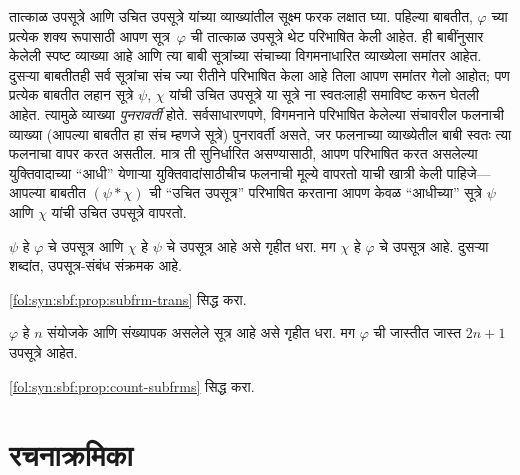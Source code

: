 \begin{explain}
तात्काळ उपसूत्रे आणि उचित उपसूत्रे यांच्या व्याख्यांतील
सूक्ष्म फरक लक्षात घ्या. पहिल्या बाबतीत, $\varphi$ च्या प्रत्येक शक्य
रूपासाठी आपण सूत्र~$\varphi$ ची तात्काळ उपसूत्रे थेट परिभाषित केली
आहेत. ही बाबींनुसार केलेली स्पष्ट व्याख्या आहे आणि त्या बाबी
सूत्रांच्या संचाच्या विगमनाधारित व्याख्येला समांतर आहेत. दुसऱ्या
बाबतीतही सर्व सूत्रांचा संच ज्या रीतीने परिभाषित केला आहे तिला
आपण समांतर गेलो आहोत; पण प्रत्येक बाबतीत लहान सूत्रे $\psi$, $\chi$
यांची उचित उपसूत्रे या सूत्रे ना स्वतःलाही समाविष्ट करून
घेतली आहेत.
त्यामुळे व्याख्या \emph{पुनरावर्ती} होते. सर्वसाधारणपणे, विगमनाने
परिभाषित केलेल्या संचावरील फलनाची व्याख्या (आपल्या बाबतीत हा संच म्हणजे
सूत्रे) पुनरावर्ती असते, जर फलनाच्या व्याख्येतील बाबी स्वतः त्या
फलनाचा वापर करत असतील. मात्र ती सुनिर्धारित असण्यासाठी, आपण परिभाषित
करत असलेल्या युक्तिवादाच्या ``आधी'' येणाऱ्या युक्तिवादांसाठीचीच फलनाची
मूल्ये वापरतो याची खात्री केली पाहिजे---आपल्या बाबतीत $(\psi \ast \chi)$
ची ``उचित उपसूत्र'' परिभाषित करताना आपण केवळ ``आधीच्या''
सूत्रे $\psi$ आणि $\chi$ यांची उचित उपसूत्रे वापरतो.
\end{explain}

\begin{prop}
\label{fol:syn:sbf:prop:subfrm-trans}
$\psi$ हे $\varphi$ चे उपसूत्र आणि $\chi$ हे $\psi$ चे उपसूत्र आहे असे गृहीत धरा.
मग $\chi$ हे $\varphi$ चे उपसूत्र आहे. दुसऱ्या शब्दांत, उपसूत्र-संबंध
संक्रमक आहे.
\end{prop}

\begin{prob}
\ref{fol:syn:sbf:prop:subfrm-trans} सिद्ध करा.
\end{prob}

\begin{prop}
\label{fol:syn:sbf:prop:count-subfrms}
$\varphi$ हे $n$ संयोजके आणि संख्यापक असलेले सूत्र आहे असे गृहीत धरा.
मग $\varphi$ ची जास्तीत जास्त $2n+1$ उपसूत्रे आहेत.
\end{prop}

\begin{prob}
\ref{fol:syn:sbf:prop:count-subfrms} सिद्ध करा.
\end{prob}












\section{रचनाक्रमिका}\label{fol:syn:fseq:sec}

